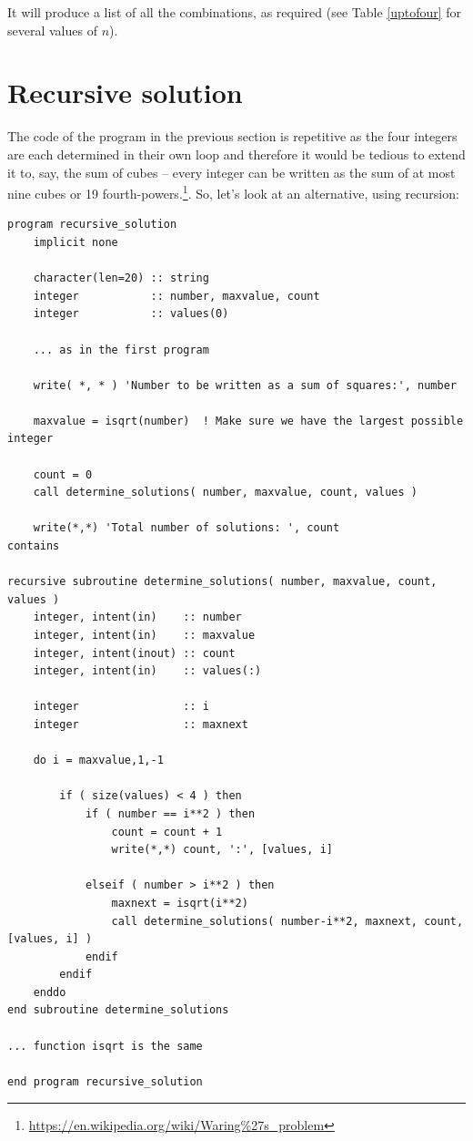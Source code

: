 \documentclass[onecolumn]{article}
\begin{document}
It will produce a list of all the combinations, as required (see Table \ref{uptofour} for several values of $n$).

\section{Recursive solution}
The code of the program in the previous section is repetitive as
the four integers are each determined in their own loop and therefore it would be tedious to extend it to, say, the sum of cubes -- every integer can
be written as the sum of at most nine cubes or 19 fourth-powers.\footnote{\url{https://en.wikipedia.org/wiki/Waring\%27s\_problem}}. So, let's
look at an alternative, using recursion:

\begin{verbatim}
program recursive_solution
    implicit none

    character(len=20) :: string
    integer           :: number, maxvalue, count
    integer           :: values(0)

    ... as in the first program

    write( *, * ) 'Number to be written as a sum of squares:', number

    maxvalue = isqrt(number)  ! Make sure we have the largest possible integer

    count = 0
    call determine_solutions( number, maxvalue, count, values )

    write(*,*) 'Total number of solutions: ', count
contains

recursive subroutine determine_solutions( number, maxvalue, count, values )
    integer, intent(in)    :: number
    integer, intent(in)    :: maxvalue
    integer, intent(inout) :: count
    integer, intent(in)    :: values(:)

    integer                :: i
    integer                :: maxnext

    do i = maxvalue,1,-1

        if ( size(values) < 4 ) then
            if ( number == i**2 ) then
                count = count + 1
                write(*,*) count, ':', [values, i]

            elseif ( number > i**2 ) then
                maxnext = isqrt(i**2)
                call determine_solutions( number-i**2, maxnext, count, [values, i] )
            endif
        endif
    enddo
end subroutine determine_solutions

... function isqrt is the same

end program recursive_solution
\end{verbatim}
\end{document}

